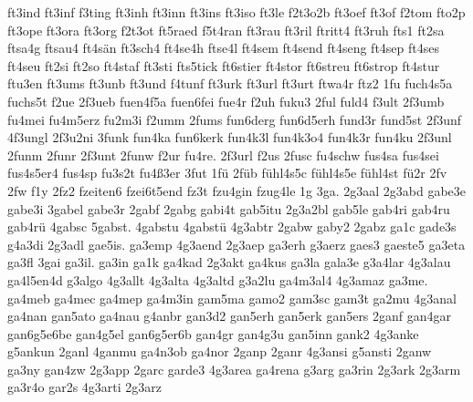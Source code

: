 {    ft3ind
    ft3inf
    f3ting
    ft3inh
    ft3inn
    ft3ins
    ft3iso
    ft3le
    f2t3o2b
    ft3oef
    ft3of
    f2tom
    fto2p
    ft3ope
    ft3ora
    ft3org
    f2t3ot
    ft5raed
    f5t4ran
    ft3rau
    ft3ril
    ftritt4
    ft3ruh
    fts1
    ft2sa
    ftsa4g
    ftsau4
    ft4sän
    ft3sch4
    ft4se4h
    ftse4l
    ft4sem
    ft4send
    ft4seng
    ft4sep
    ft4ses
    ft4seu
    ft2si
    ft2so
    ft4staf
    ft3sti
    fts5tick
    ft6stier
    ft4stor
    ft6streu
    ft6strop
    ft4stur
    ftu3en
    ft3ums
    ft3unb
    ft3und
    f4tunf
    ft3urk
    ft3url
    ft3urt
    ftwa4r
    ftz2
    1fu
    fuch4s5a
    fuchs5t
    f2ue
    2f3ueb
    fuen4f5a
    fuen6fei
    fue4r
    f2uh
    fuku3
    2ful
    fuld4
    f3ult
    2f3umb
    fu4mei
    fu4m5erz
    fu2m3i
    f2umm
    2fums
    fun6derg
    fun6d5erh
    fund3r
    fund5st
    2f3unf
    4f3ungl
    2f3u2ni
    3funk
    fun4ka
    fun6kerk
    fun4k3l
    fun4k3o4
    fun4k3r
    fun4ku
    2f3unl
    2funm
    2funr
    2f3unt
    2funw
    f2ur
    fu4re.
    2f3url
    f2us
    2fusc
    fu4schw
    fus4sa
    fus4sei
    fus4s5er4
    fus4sp
    fu3s2t
    fu4ß3er
    3fut
    1fü
    2füb
    fühl4s5c
    fühl4s5e
    fühl4st
    fü2r
    2fv
    2fw
    f1y
    2fz2
    fzeiten6
    fzei6t5end
    fz3t
    fzu4gin
    fzug4le
    1g
    3ga.
    2g3aal
    2g3abd
    gabe3e
    gabe3i
    3gabel
    gabe3r
    2gabf
    2gabg
    gabi4t
    gab5itu
    2g3a2bl
    gab5le
    gab4ri
    gab4ru
    gab4rü
    4gabsc
    5gabst.
    4gabstu
    4gabstü
    4g3abtr
    2gabw
    gaby2
    2gabz
    ga1c
    gade3s
    g4a3di
    2g3adl
    gae5is.
    ga3emp
    4g3aend
    2g3aep
    ga3erh
    g3aerz
    gaes3
    gaeste5
    ga3eta
    ga3fl
    3gai
    ga3il.
    ga3in
    ga1k
    ga4kad
    2g3akt
    ga4kus
    ga3la
    gala3e
    g3a4lar
    4g3alau
    ga4l5en4d
    g3algo
    4g3allt
    4g3alta
    4g3altd
    g3a2lu
    ga4m3al4
    4g3amaz
    ga3me.
    ga4meb
    ga4mec
    ga4mep
    ga4m3in
    gam5ma
    gamo2
    gam3sc
    gam3t
    ga2mu
    4g3anal
    ga4nan
    gan5ato
    ga4nau
    g4anbr
    gan3d2
    gan5erh
    gan5erk
    gan5ers
    2ganf
    gan4gar
    gan6g5e6be
    gan4g5el
    gan6g5er6b
    gan4gr
    gan4g3u
    gan5inn
    gank2
    4g3anke
    g5ankun
    2ganl
    4ganmu
    ga4n3ob
    ga4nor
    2ganp
    2ganr
    4g3ansi
    g5ansti
    2ganw
    ga3ny
    gan4zw
    2g3app
    2garc
    garde3
    4g3area
    ga4rena
    g3arg
    ga3rin
    2g3ark
    2g3arm
    ga3r4o
    gar2s
    4g3arti
    2g3arz
}
